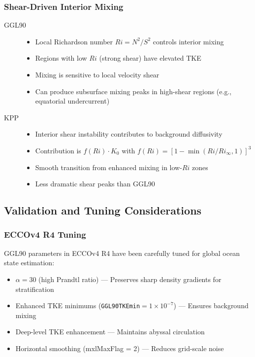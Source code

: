\documentclass[11pt, a4paper]{article}
\begin{document}
\subsubsection{Shear-Driven Interior Mixing}

\begin{description}
    \item[GGL90]
    \begin{itemize}
        \item Local Richardson number $Ri = N^2/S^2$ controls interior mixing
        \item Regions with low $Ri$ (strong shear) have elevated TKE
        \item Mixing is sensitive to local velocity shear
        \item Can produce subsurface mixing peaks in high-shear regions (e.g., equatorial undercurrent)
    \end{itemize}
    
    \item[KPP]
    \begin{itemize}
        \item Interior shear instability contributes to background diffusivity
        \item Contribution is $f(Ri) \cdot K_0$ with $f(Ri) = [1 - \min(Ri/Ri_\infty, 1)]^3$
        \item Smooth transition from enhanced mixing in low-$Ri$ zones
        \item Less dramatic shear peaks than GGL90
    \end{itemize}
\end{description}

\subsection{Validation and Tuning Considerations}

\subsubsection{ECCOv4 R4 Tuning}

GGL90 parameters in ECCOv4 R4 have been carefully tuned for global ocean state estimation:

\begin{itemize}
    \item $\alpha = 30$ (high Prandtl ratio) — Preserves sharp density gradients for stratification
    \item Enhanced TKE minimums (\texttt{GGL90TKEmin}$= 1 \times 10^{-7}$) — Ensures background mixing
    \item Deep-level TKE enhancement — Maintains abyssal circulation
    \item Horizontal smoothing (mxlMaxFlag = 2) — Reduces grid-scale noise
\end{itemize}
\end{document}

